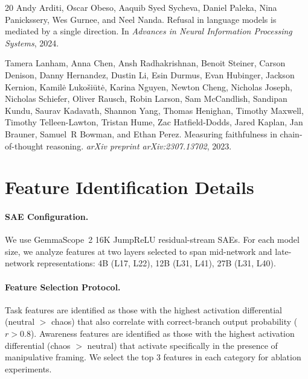 \documentclass[10pt,twocolumn]{article}
\newcommand{\gemmascope}{GemmaScope~2\xspace}
\begin{document}
\begin{thebibliography}{20}
Andy Arditi, Oscar Obeso, Aaquib Syed Sycheva, Daniel Paleka, Nina Panickssery, Wes Gurnee, and Neel Nanda.
\newblock Refusal in language models is mediated by a single direction.
\newblock In \emph{Advances in Neural Information Processing Systems}, 2024.

Tamera Lanham, Anna Chen, Ansh Radhakrishnan, Benoit Steiner, Carson Denison, Danny Hernandez, Dustin Li, Esin Durmus, Evan Hubinger, Jackson Kernion, Kamil{\.e} Luko{\v{s}}i{\=u}t{\.e}, Karina Nguyen, Newton Cheng, Nicholas Joseph, Nicholas Schiefer, Oliver Rausch, Robin Larson, Sam McCandlish, Sandipan Kundu, Saurav Kadavath, Shannon Yang, Thomas Henighan, Timothy Maxwell, Timothy Telleen-Lawton, Tristan Hume, Zac Hatfield-Dodds, Jared Kaplan, Jan Brauner, Samuel~R Bowman, and Ethan Perez.
\newblock Measuring faithfulness in chain-of-thought reasoning.
\newblock \emph{arXiv preprint arXiv:2307.13702}, 2023.

\end{thebibliography}

\appendix
\section{Feature Identification Details}
\label{app:features}

\paragraph{SAE Configuration.}
We use \gemmascope 16K JumpReLU residual-stream SAEs.
For each model size, we analyze features at two layers selected to span mid-network and late-network representations: 4B (L17, L22), 12B (L31, L41), 27B (L31, L40).

\paragraph{Feature Selection Protocol.}
Task features are identified as those with the highest activation differential (neutral $>$ chaos) that also correlate with correct-branch output probability ($r > 0.8$).
Awareness features are identified as those with the highest activation differential (chaos $>$ neutral) that activate specifically in the presence of manipulative framing.
We select the top 3 features in each category for ablation experiments.
\end{document}
